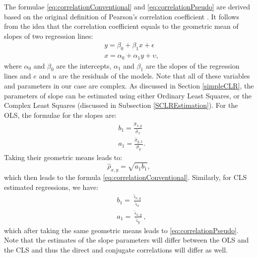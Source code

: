 \documentclass[
]{book}
\begin{document}
The formulae \eqref{eq:correlationConventional} and \eqref{eq:correlationPseudo} are derived based on the original definition of Pearson's correlation coefficient \citep{refPearson}. It follows from the idea that the correlation coefficient equals to the geometric mean of slopes of two regression lines:
\begin{equation}
    \begin{aligned}
        &y = \beta_0 + \beta_1 x + \epsilon \\
        &x = \alpha_0 + \alpha_1 y + \upsilon ,
    \end{aligned}
    \label{eq:twoRegressions}
\end{equation}
where \(\alpha_0\) and \(\beta_0\) are the intercepts, \(\alpha_1\) and \(\beta_1\) are the slopes of the regression lines and \(e\) and \(u\) are the residuals of the models. Note that all of these variables and parameters in our case are complex. As discussed in Section \ref{simpleCLR}, the parameters of slope can be estimated using either Ordinary Least Squares, or the Complex Least Squares (discussed in Subsection \ref{SCLREstimation}). For the OLS, the formulae for the slopes are:
\begin{equation}
    \begin{aligned}
        &b_1 = \frac{\hat{\sigma}_{x,y}}{\hat{\sigma}_x} \\
        &a_1 = \frac{\hat{\sigma}_{y,x}}{\hat{\sigma}_y} .
    \end{aligned}
    \label{eq:twoRegressionsOLS}
\end{equation}
Taking their geometric means leads to:
\begin{equation}
    \hat{\rho}_{x,y} = \sqrt{a_1 b_1},
    \label{eq:correlationConventionalEstimate}
\end{equation}
which then leads to the formula \eqref{eq:correlationConventional}. Similarly, for CLS estimated regressions, we have:
\begin{equation}
    \begin{aligned}
        &b_1 = \frac{\hat{\varsigma}_{x,y}}{\hat{\varsigma}_x} \\
        &a_1 = \frac{\hat{\varsigma}_{x,y}}{\hat{\varsigma}_y} ,
    \end{aligned}
    \label{eq:twoRegressionsCLS}
\end{equation}
which after taking the same geometric means leads to \eqref{eq:correlationPseudo}. Note that the estimates of the slope parameters will differ between the OLS and the CLS and thus the direct and conjugate correlations will differ as well.
\end{document}
